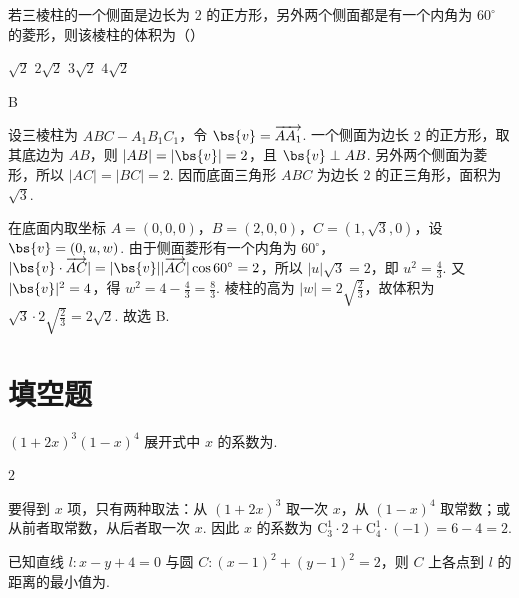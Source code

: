 \begin{problem}
若三棱柱的一个侧面是边长为 \(2\) 的正方形，另外两个侧面都是有一个内角为 \(60^{\circ}\) 的菱形，则该棱柱的体积为（\quad）

\choices
    {\(\sqrt{2}\)}
    {\(2\sqrt{2}\)}
    {\(3\sqrt{2}\)}
    {\(4\sqrt{2}\)}
\end{problem}

\begin{answer}
B
\end{answer}

\begin{solution}
设三棱柱为 \(ABC-A_{1}B_{1}C_{1}\)，令 \(\bs{v}=\overrightarrow{AA_{1}}\). 一个侧面为边长 \(2\) 的正方形，取其底边为 \(AB\)，则 \(\lvert AB\rvert=\lvert\bs{v}\rvert=2\)，且 \(\bs{v}\perp AB\). 另外两个侧面为菱形，所以 \(\lvert AC\rvert=\lvert BC\rvert=2\). 因而底面三角形 \(ABC\) 为边长 \(2\) 的正三角形，面积为 \(\sqrt3\).

在底面内取坐标 \(A=(0,0,0)\)，\(B=(2,0,0)\)，\(C=(1,\sqrt3,0)\)，设 \(\bs{v}=(0,u,w)\). 由于侧面菱形有一个内角为 \(60^{\circ}\)，\(\lvert\bs{v}\cdot\overrightarrow{AC}\rvert=\lvert\bs{v}\rvert\lvert\overrightarrow{AC}\rvert\cos60^{\circ}=2\)，所以 \(\lvert u\rvert\sqrt3=2\)，即 \(u^{2}=\frac43\). 又 \(\lvert\bs{v}\rvert^{2}=4\)，得 \(w^{2}=4-\frac43=\frac83\). 棱柱的高为 \(\lvert w\rvert=2\sqrt{\frac23}\)，故体积为 \(\sqrt3\cdot2\sqrt{\frac23}=2\sqrt2\). 故选 B.
\end{solution}

\section{填空题}

\begin{problem}
\((1 + 2x)^{3}(1 - x)^{4}\) 展开式中 \(x\) 的系数为\fillinblank{}.
\end{problem}

\begin{answer}
\(2\)
\end{answer}

\begin{solution}
要得到 \(x\) 项，只有两种取法：从 \((1+2x)^{3}\) 取一次 \(x\)，从 \((1-x)^{4}\) 取常数；或从前者取常数，从后者取一次 \(x\). 因此 \(x\) 的系数为 \(\mathrm C_{3}^{1}\cdot2+\mathrm C_{4}^{1}\cdot(-1)=6-4=2\).
\end{solution}

\begin{problem}
已知直线 \(l: x - y + 4 = 0\) 与圆 \(C: (x - 1)^{2} + (y - 1)^{2} = 2\)，则 \(C\) 上各点到 \(l\) 的距离的最小值为\fillinblank{}.
\end{problem}

